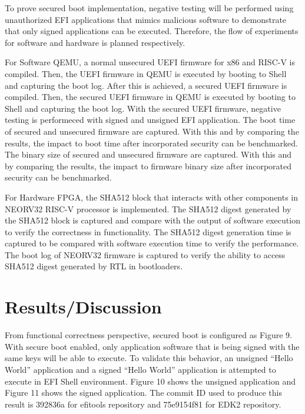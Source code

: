 \documentclass[a4paper,fleqn]{cas-dc}
\begin{document}
To prove secured boot implementation, negative testing will be performed using unauthorized EFI applications that mimics malicious software to demonstrate that only signed applications can be executed. Therefore, the flow of experiments for software and hardware is planned respectively.

For Software QEMU, a normal unsecured UEFI firmware for x86 and RISC-V is compiled. Then, the UEFI firmware in QEMU is executed by booting to Shell and capturing the boot log.
After this is achieved, a secured UEFI firmware is compiled. Then, the secured UEFI firmware in QEMU is executed by booting to Shell and capturing the boot log.
With the secured UEFI firmware, negative testing is performeced with signed and unsigned EFI application.
The boot time of secured and unsecured firmware are captured. With this and by comparing the results, the impact to boot time after incorporated security can be benchmarked.
The binary size of secured and unsecured firmware are captured. With this and by comparing the results, the impact to firmware binary size after incorporated security can be benchmarked.

For Hardware FPGA, the SHA512 block that interacts with other components in NEORV32 RISC-V processor is implemented.
The SHA512 digest generated by the SHA512 block is captured and compare with the output of software execution to verify the correctness in functionality.
The SHA512 digest generation time is captured to be compared with software execution time to verify the performance.
The boot log of NEORV32 firmware is captured to verify the ability to access SHA512 digest generated by RTL in bootloaders.


\section{ Results/Discussion}
From functional correctness perspective, secured boot is configured as Figure 9. With secure boot enabled, only application software that is being signed with the same keys will be able to execute. To validate this behavior, an unsigned “Hello World” application and a signed “Hello World” application is attempted to execute in EFI Shell environment. Figure 10 shows the unsigned application and Figure 11 shows the signed application. The commit ID used to produce this result is 392836a for efitools repository and 75e9154f81 for EDK2 repository.
\end{document}
